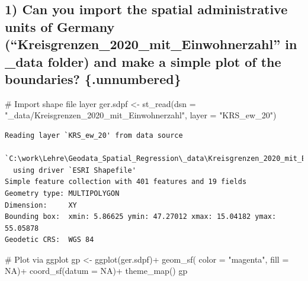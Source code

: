 \documentclass[
  letterpaper,
]{scrbook}
\newenvironment{Shaded}{\begin{snugshade}}{\end{snugshade}}
\newcommand{\AttributeTok}[1]{\textcolor[rgb]{0.40,0.45,0.13}{#1}}
\newcommand{\CommentTok}[1]{\textcolor[rgb]{0.37,0.37,0.37}{#1}}
\newcommand{\ConstantTok}[1]{\textcolor[rgb]{0.56,0.35,0.01}{#1}}
\newcommand{\FunctionTok}[1]{\textcolor[rgb]{0.28,0.35,0.67}{#1}}
\newcommand{\NormalTok}[1]{\textcolor[rgb]{0.00,0.23,0.31}{#1}}
\newcommand{\OtherTok}[1]{\textcolor[rgb]{0.00,0.23,0.31}{#1}}
\newcommand{\SpecialCharTok}[1]{\textcolor[rgb]{0.37,0.37,0.37}{#1}}
\newcommand{\StringTok}[1]{\textcolor[rgb]{0.13,0.47,0.30}{#1}}
\begin{document}
\hypertarget{can-you-import-the-spatial-administrative-units-of-germany-kreisgrenzen_2020_mit_einwohnerzahl-in-_data-folder-and-make-a-simple-plot-of-the-boundaries-.unnumbered}{%
\subsection{1) Can you import the spatial administrative units of
Germany (``Kreisgrenzen\_2020\_mit\_Einwohnerzahl'' in \_data folder)
and make a simple plot of the boundaries?
\{.unnumbered\}}\label{can-you-import-the-spatial-administrative-units-of-germany-kreisgrenzen_2020_mit_einwohnerzahl-in-_data-folder-and-make-a-simple-plot-of-the-boundaries-.unnumbered}}

\begin{Shaded}
\begin{Highlighting}[]
\CommentTok{\# Import shape file layer}
\NormalTok{ger.sdpf }\OtherTok{\textless{}{-}} \FunctionTok{st\_read}\NormalTok{(}\AttributeTok{dsn =} \StringTok{"\_data/Kreisgrenzen\_2020\_mit\_Einwohnerzahl"}\NormalTok{,}
                    \AttributeTok{layer =} \StringTok{"KRS\_ew\_20"}\NormalTok{)}
\end{Highlighting}
\end{Shaded}

\begin{verbatim}
Reading layer `KRS_ew_20' from data source 
  `C:\work\Lehre\Geodata_Spatial_Regression\_data\Kreisgrenzen_2020_mit_Einwohnerzahl' 
  using driver `ESRI Shapefile'
Simple feature collection with 401 features and 19 fields
Geometry type: MULTIPOLYGON
Dimension:     XY
Bounding box:  xmin: 5.86625 ymin: 47.27012 xmax: 15.04182 ymax: 55.05878
Geodetic CRS:  WGS 84
\end{verbatim}

\begin{Shaded}
\begin{Highlighting}[]
\CommentTok{\# Plot via ggplot}
\NormalTok{gp }\OtherTok{\textless{}{-}} \FunctionTok{ggplot}\NormalTok{(ger.sdpf)}\SpecialCharTok{+}
    \FunctionTok{geom\_sf}\NormalTok{( }\AttributeTok{color =} \StringTok{"magenta"}\NormalTok{, }\AttributeTok{fill =} \ConstantTok{NA}\NormalTok{)}\SpecialCharTok{+}
    \FunctionTok{coord\_sf}\NormalTok{(}\AttributeTok{datum =} \ConstantTok{NA}\NormalTok{)}\SpecialCharTok{+}
    \FunctionTok{theme\_map}\NormalTok{()}
\NormalTok{gp}
\end{Highlighting}
\end{Shaded}
\end{document}
